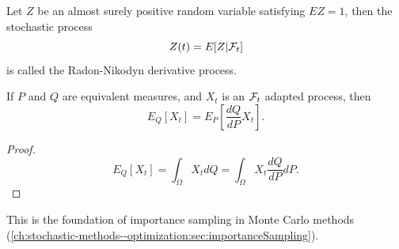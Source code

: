 \begin{refsection}
\begin{definition}\cite[211]{shreve2004stochastic2}
	Let $Z$ be an almost surely positive random variable satisfying $EZ = 1$, then the stochastic process
	$$Z(t) = E[Z|\mathcal{F}_t]$$
	is called the Radon-Nikodyn derivative process.
\end{definition}

\begin{lemma}
	If $P$ and $Q$ are equivalent measures, and $X_t$ is an $\mathcal{F}_t$ adapted process, then 
	$$E_Q[X_t] = E_P[\frac{dQ}{dP}X_t].$$
\end{lemma}
\begin{proof}
	$$E_Q[X_t] = \int_{\Omega} X_t dQ = \int_{\Omega} X_t \frac{dQ}{dP} dP.$$
\end{proof}

\begin{remark}
	This is the foundation of importance sampling in Monte Carlo methods (\autoref{ch:stochastic-methods--optimization:sec:importanceSampling}).
\end{remark}



\end{refsection}

